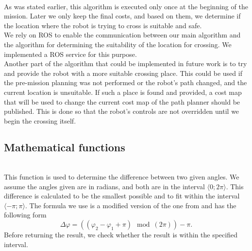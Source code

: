         \\
            As was stated earlier, this algorithm is executed only once at the beginning of the mission. Later we only keep the final costs, and based on them, we determine if the location where the robot is trying to cross is suitable and safe.\\
            We rely on ROS to enable the communication between our main algorithm and the algorithm for determining the suitability of the location for crossing. We implemented a ROS service for this purpose.\\
            Another part of the algorithm that could be implemented in future work is to try and provide the robot with a more suitable crossing place. This could be used if the pre-mission planning was not performed or the robot's path changed, and the current location is unsuitable. If such a place is found and provided, a cost map that will be used to change the current cost map of the path planner should be published. This is done so that the robot's controls are not overridden until we begin the crossing itself.

    \subsection{Mathematical functions}
    \label{sec:math_func}
        \\
            This function is used to determine the difference between two given angles. We assume the angles given are in radians, and both are in the interval $\langle0;2\pi\rangle$. This difference is calculated to be the smallest possible and to fit within the interval $\langle-\pi;\pi\rangle$. The formula we use is a modified version of the one from \cite{calc_rotation} and has the following form
            \begin{equation}
                \Delta\varphi = \left((\varphi_{2} - \varphi_{1} + \pi) \mod (2\pi)\right) - \pi.
            \end{equation}
            Before returning the result, we check whether the result is within the specified interval.

